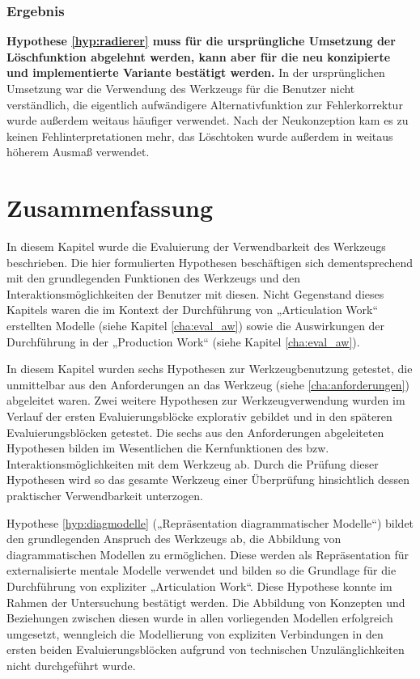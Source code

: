 \subsubsection{Ergebnis} %

\textbf{Hypothese \ref{hyp:radierer} muss für die ursprüngliche Umsetzung der Löschfunktion abgelehnt werden, kann aber für die neu konzipierte und implementierte Variante bestätigt werden.} In der ursprünglichen Umsetzung war die Verwendung des Werkzeugs für die Benutzer nicht verständlich, die eigentlich aufwändigere Alternativfunktion zur Fehlerkorrektur wurde außerdem weitaus häufiger verwendet. Nach der Neukonzeption kam es zu keinen Fehlinterpretationen mehr, das Löschtoken wurde außerdem in weitaus höherem Ausmaß verwendet.


\section{Zusammenfassung}
\label{sec:t_zusammenfassung}

In diesem Kapitel wurde die Evaluierung der Verwendbarkeit des Werkzeugs beschrieben. Die hier formulierten Hypothesen beschäftigen sich dementsprechend mit den grundlegenden Funktionen des Werkzeugs und den Interaktionsmöglichkeiten der Benutzer mit diesen. Nicht Gegenstand dieses Kapitels waren die im Kontext der Durchführung von „Articulation Work“ erstellten Modelle (siehe Kapitel \ref{cha:eval_aw}) sowie die Auswirkungen der Durchführung in der „Production Work“ (siehe Kapitel \ref{cha:eval_aw}).

In diesem Kapitel wurden sechs Hypothesen zur Werkzeugbenutzung getestet, die unmittelbar aus den Anforderungen an das Werkzeug (siehe \ref{cha:anforderungen}) abgeleitet waren. Zwei weitere Hypothesen zur Werkzeugverwendung wurden im Verlauf der ersten Evaluierungsblöcke explorativ gebildet und in den späteren Evaluierungsblöcken getestet. Die sechs aus den Anforderungen abgeleiteten Hypothesen bilden im Wesentlichen die Kernfunktionen des bzw. Interaktionsmöglichkeiten mit dem Werkzeug ab. Durch die Prüfung dieser Hypothesen wird so das gesamte Werkzeug einer Überprüfung hinsichtlich dessen praktischer Verwendbarkeit unterzogen.

Hypothese \ref{hyp:diagmodelle} („Repräsentation diagrammatischer Modelle“) bildet den grundlegenden Anspruch des Werkzeugs ab, die Abbildung von diagrammatischen Modellen zu ermöglichen. Diese werden als Repräsentation für externalisierte mentale Modelle verwendet und bilden so die Grundlage für die Durchführung von expliziter „Articulation Work“. Diese Hypothese konnte im Rahmen der Untersuchung bestätigt werden. Die Abbildung von Konzepten und Beziehungen zwischen diesen wurde in allen vorliegenden Modellen erfolgreich umgesetzt, wenngleich die Modellierung von expliziten Verbindungen in den ersten beiden Evaluierungsblöcken aufgrund von technischen Unzulänglichkeiten nicht durchgeführt wurde.

